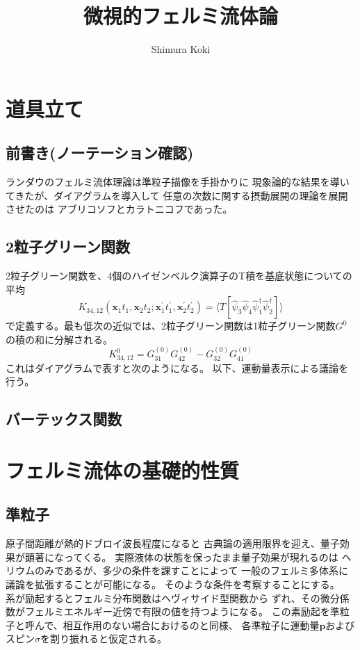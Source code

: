 \documentclass[11pt,a4j]{jarticle}
\title{微視的フェルミ流体論}
\author{Shimura Koki}
\date{}
\begin{document}
\maketitle
\section{道具立て}
\subsection{前書き(ノーテーション確認)}
ランダウのフェルミ流体理論は準粒子描像を手掛かりに
現象論的な結果を導いてきたが、ダイアグラムを導入して
任意の次数に関する摂動展開の理論を展開させたのは
アブリコソフとカラトニコフであった。

\subsection{2粒子グリーン関数}
2粒子グリーン関数を、4個のハイゼンベルク演算子のT積を基底状態についての
平均
\begin{equation}
    K_{34,12}(\bm{x}_1t_1,\bm{x}_2t_2;\bm{x}^{'}_1t^{'}_1,\bm{x}^{'}_2t^{'}_2) =
     \langle T [\hat{\psi}_3 \hat{\psi}_4 \hat{\psi}^{\dagger}_1\hat{\psi}^{\dagger}_2]\rangle
\end{equation}
で定義する。最も低次の近似では、2粒子グリーン関数は1粒子グリーン関数$G^{0}$の積の和に分解される。
\begin{equation}
    K_{34,12}^{0} = G_{31}^{(0)}G_{42}^{(0)} - G_{32}^{(0)}G_{41}^{(0)} 
\end{equation}
これはダイアグラムで表すと次のようになる。
以下、運動量表示による議論を行う。

\subsection{バーテックス関数}

\section{フェルミ流体の基礎的性質}
\subsection{準粒子}
原子間距離が熱的ドブロイ波長程度になると
古典論の適用限界を迎え、量子効果が顕著になってくる。
実際液体の状態を保ったまま量子効果が現れるのは
ヘリウムのみであるが、多少の条件を課すことによって
一般のフェルミ多体系に議論を拡張することが可能になる。
そのような条件を考察することにする。\\
系が励起するとフェルミ分布関数はヘヴィサイド型関数から
ずれ、その微分係数がフェルミエネルギー近傍で有限の値を持つようになる。
この素励起を準粒子と呼んで、相互作用のない場合におけるのと同様、
各準粒子に運動量$\bm{p}$およびスピン$\sigma$を割り振れると仮定される。
\end{document}
